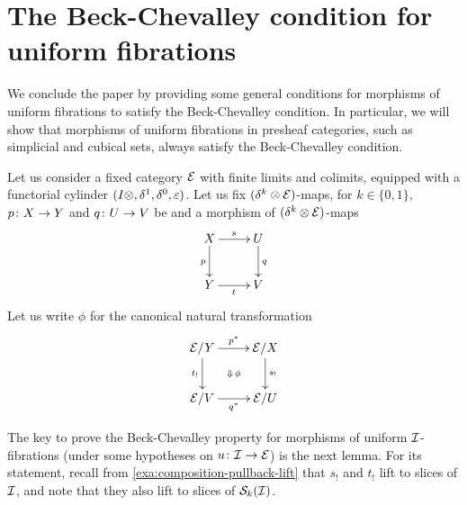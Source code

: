 \documentclass[reqno,10pt,a4paper,oneside,draft]{amsart}
\begin{document}

\section{The Beck-Chevalley condition for uniform fibrations}
\label{sec:becccu}

We conclude the paper by providing some general conditions for morphisms of uniform fibrations to satisfy 
the Beck-Chevalley condition. In particular, we will show that morphisms of uniform fibrations in presheaf
categories, such as simplicial and cubical sets, always satisfy the Beck-Chevalley condition.


\medskip

Let us consider a fixed category $\catE$ with finite limits and colimits, equipped with a functorial cylinder
$(\interval \otimes, \rcyl, \lcyl, \ccyl)$. Let us fix  $(\kcyl \otimes \catE)$-maps, for $k \in \{0 , 1\}$, $p \co X \to Y$ and $q \co U \to V$ be
and a morphism of $(\kcyl \otimes \catE)$-maps
\begin{equation} \label{strong-h-equiv-base-change-along-fibration-BC:0}
\begin{gathered}
\xymatrix{
X \ar[r]^s \ar[d]_{p} & U \ar[d]^{q} \\
Y \ar[r]_t & V}
\end{gathered}
\end{equation}
Let us write $\phi$ for the canonical natural transformation
\begin{equation} \label{strong-h-equiv-base-change-along-fibration-BC:1}
\begin{gathered}
\xymatrix{
  \catE/Y
  \ar[r]^{p^*}
  \ar[d]_{t_!}
  \ar@{}[dr]|{\Downarrow \, \phi}
&
  \catE/X
  \ar[d]^{s_!}
\\
  \catE/V
  \ar[r]_{q^*}
&
  \catE/U
}
\end{gathered}
\end{equation}

The key to prove the Beck-Chevalley property for morphisms of uniform $\cal{I}$-fibrations (under some hypotheses on $u \co \cal{I} \to \cal{E}$)
is the next lemma.  For its statement, recall from \cref{exa:composition-pullback-lift} that $s_!$ and $t_!$ lift 
to slices of $\cal{I}$, and note that they also lift to slices of $\cal{S}_k(\cal{I})$. 
\end{document}
